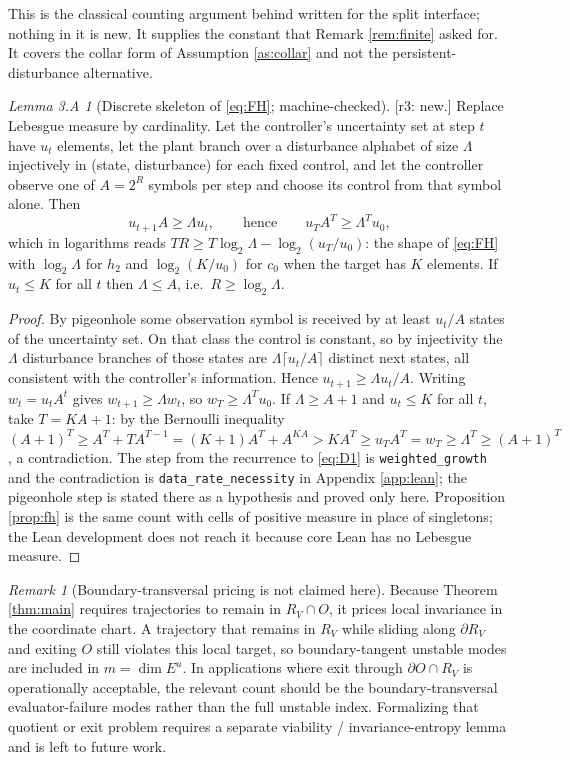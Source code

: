 \documentclass[11pt]{article}
\theoremstyle{definition}
\theoremstyle{remark}
\newtheorem{remark}{Remark}[section]
\newtheorem*{lemthreeA}{Lemma 3.A}
\newcommand{\RV}{R_V}
\newcommand{\Eu}{E^u}
\newcommand{\htwo}{h_2}
\newcommand{\revnote}[1]{\textcolor{red!60!black}{[r3: #1]}}
\begin{document}
This is the classical counting argument behind \cite{nair2000,colonius2009,kawan2013} written for the split interface; nothing in it is new. It supplies the constant that Remark \ref{rem:finite} asked for. It covers the collar form of Assumption \ref{as:collar} and not the persistent-disturbance alternative.

\begin{lemthreeA}[Discrete skeleton of \eqref{eq:FH}; machine-checked]
\revnote{new.} Replace Lebesgue measure by cardinality. Let the controller's uncertainty set at step $t$ have $u_t$ elements, let the plant branch over a disturbance alphabet of size $\Lambda$ injectively in (state, disturbance) for each fixed control, and let the controller observe one of $A=2^{R}$ symbols per step and choose its control from that symbol alone. Then
\begin{equation}
u_{t+1}A\ge\Lambda u_t,\qquad\text{hence}\qquad u_TA^T\ge\Lambda^Tu_0, \tag{D1}\label{eq:D1}
\end{equation}
which in logarithms reads $TR\ge T\log_2\Lambda-\log_2(u_T/u_0)$: the shape of \eqref{eq:FH} with $\log_2\Lambda$ for $\htwo$ and $\log_2(K/u_0)$ for $c_0$ when the target has $K$ elements. If $u_t\le K$ for all $t$ then $\Lambda\le A$, i.e.\ $R\ge\log_2\Lambda$.
\end{lemthreeA}
\begin{proof}
By pigeonhole some observation symbol is received by at least $u_t/A$ states of the uncertainty set. On that class the control is constant, so by injectivity the $\Lambda$ disturbance branches of those states are $\Lambda\lceil u_t/A\rceil$ distinct next states, all consistent with the controller's information. Hence $u_{t+1}\ge\Lambda u_t/A$. Writing $w_t=u_tA^t$ gives $w_{t+1}\ge\Lambda w_t$, so $w_T\ge\Lambda^Tu_0$. If $\Lambda\ge A+1$ and $u_t\le K$ for all $t$, take $T=KA+1$: by the Bernoulli inequality $(A+1)^T\ge A^T+TA^{T-1}=(K+1)A^T+A^{KA}>KA^T\ge u_TA^T=w_T\ge\Lambda^T\ge(A+1)^T$, a contradiction. The step from the recurrence to \eqref{eq:D1} is \texttt{weighted\_growth} and the contradiction is \texttt{data\_rate\_necessity} in Appendix \ref{app:lean}; the pigeonhole step is stated there as a hypothesis and proved only here. Proposition \ref{prop:fh} is the same count with cells of positive measure in place of singletons; the Lean development does not reach it because core Lean has no Lebesgue measure.
\end{proof}

\begin{remark}[Boundary-transversal pricing is not claimed here]\label{rem:transversal}
Because Theorem \ref{thm:main} requires trajectories to remain in $\RV\cap O$, it prices local invariance in the coordinate chart. A trajectory that remains in $\RV$ while sliding along $\partial\RV$ and exiting $O$ still violates this local target, so boundary-tangent unstable modes are included in $m=\dim\Eu$. In applications where exit through $\partial O\cap\RV$ is operationally acceptable, the relevant count should be the boundary-transversal evaluator-failure modes rather than the full unstable index. Formalizing that quotient or exit problem requires a separate viability / invariance-entropy lemma and is left to future work.
\end{remark}
\end{document}
